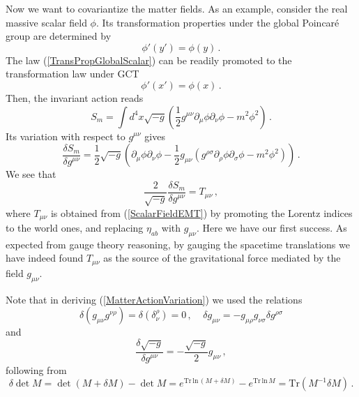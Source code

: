 \documentclass[11pt,a4paper]{article}
\begin{document}
Now we want to covariantize the matter fields. As an example, consider the real massive scalar field $\phi$. Its transformation properties under the global Poincar\'e group are determined by
\begin{equation}\label{TransPropGlobalScalar}
\phi'(y')=\phi(y) \,.
\end{equation}
The law (\ref{TransPropGlobalScalar}) can be readily promoted to the transformation law under GCT
\begin{equation}
\phi'(x')=\phi(x) \,.
\end{equation}
Then, the invariant action reads
\begin{equation}
S_m=\int d^4x\sqrt{-g}\left(\dfrac{1}{2}g^{\mu\nu}\partial_\mu\phi\partial_\nu\phi-m^2\phi^2\right) \,.
\end{equation}
Its variation with respect to $g^{\mu\nu}$ gives
\begin{equation}\label{MatterActionVariation}
\dfrac{\delta S_m}{\delta g^{\mu\nu}}=\dfrac{1}{2}\sqrt{-g}\left(\partial_\mu\phi\partial_\nu\phi-\dfrac{1}{2}g_{\mu\nu}(g^{\rho\sigma}\partial_\rho\phi\partial_\sigma\phi-m^2\phi^2)\right) \,.
\end{equation}
We see that
\begin{equation}
\dfrac{2}{\sqrt{-g}}\dfrac{\delta S_m}{\delta g^{\mu\nu}}=T_{\mu\nu} \,,
\end{equation}
where $T_{\mu\nu}$ is obtained from (\ref{ScalarFieldEMT}) by promoting the Lorentz indices to the world ones, and replacing $\eta_{ab}$ with $g_{\mu\nu}$. Here we have our first success. As expected from gauge theory reasoning, by gauging the spacetime translations we have indeed found  $T_{\mu\nu}$ as the source of the gravitational force mediated by the field $g_{\mu\nu}$.

Note that in deriving (\ref{MatterActionVariation}) we used the relations
\begin{equation}
\delta(g_{\mu\nu}g^{\nu\rho})=\delta(\delta^\rho_\nu)=0 \,,~~~~~ \delta g_{\mu\nu}=-g_{\mu\rho}g_{\nu\sigma}\delta g^{\rho\sigma}
\end{equation}
and
\begin{equation}
\dfrac{\delta\sqrt{-g}}{\delta g^{\mu\nu}}=-\dfrac{\sqrt{-g}}{2}g_{\mu\nu} \,,
\end{equation}
following from
\begin{equation}
\delta\det M=\det(M+\delta M)-\det M=e^{\text{Tr}\,\text{ln}\, (M+\delta M)}-e^{\text{Tr}\,\text{ln}\,  M}=\text{Tr}(M^{-1}\delta M) \,.
\end{equation}
\end{document}
